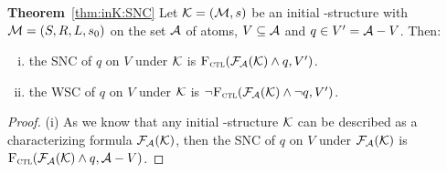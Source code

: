 \documentclass[letterpaper]{article} %
\begin{document}
\noindent \textbf{Theorem}~\ref{thm:inK:SNC} Let ${\cal K}= ({\cal M}, s)$ be an initial \MPK-structure with ${\cal M}=(S,R,L,s_0)$ on the set ${\cal A}$ of atoms, $V \subseteq {\cal A}$ and $q\in V' = {\cal A} - V$. Then:
 \begin{enumerate}[(i)]
   \item the SNC of $q$ on $V$ under ${\cal K}$ is ${\textsc{F}_{\textsc{ctl}}}({\cal F}_{{\cal A}}({\cal K}) \wedge q, V')$.
   \item the WSC of $q$ on $V$ under ${\cal K}$ is $\neg {\textsc{F}_{\textsc{ctl}}}({\cal F}_{{\cal A}}({\cal K}) \wedge \neg q, V')$.
 \end{enumerate}
\begin{proof}
(i)
As we know that any initial \MPK-structure ${\cal K}$ can be described as a characterizing formula ${\cal F}_{{\cal A}}({\cal K})$, then the SNC of $q$ on $V$ under ${\cal F}_{{\cal A}}({\cal K})$ is ${\textsc{F}_{\textsc{ctl}}}({\cal F}_{{\cal A}}({\cal K}) \wedge q, {\cal A} - V)$.

%


\end{proof}
\end{document}
